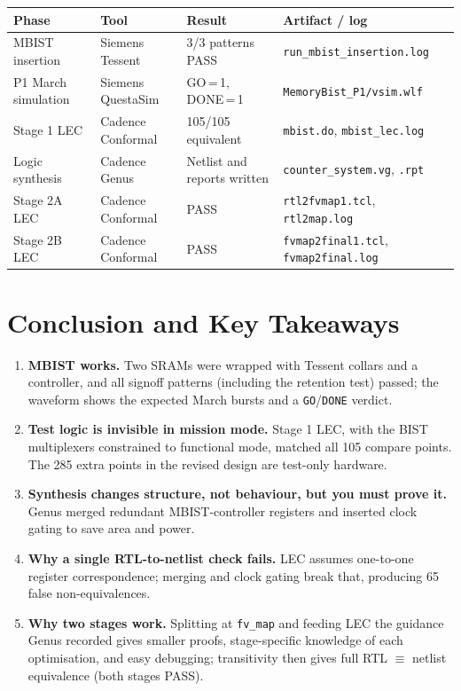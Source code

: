 \documentclass[11pt]{article}
\newcommand{\code}[1]{\texttt{\small #1}}
\begin{document}
\begin{center}
\small
\begin{tabular}{@{}p{3.1cm}p{3.1cm}p{3.5cm}p{4.6cm}@{}}
\toprule
\textbf{Phase} & \textbf{Tool} & \textbf{Result} & \textbf{Artifact / log} \\ \midrule
MBIST insertion & Siemens Tessent & 3/3 patterns PASS & \code{run\_mbist\_insertion.log} \\
P1 March simulation & Siemens QuestaSim & GO\,=\,1, DONE\,=\,1 & \code{MemoryBist\_P1/vsim.wlf} \\
Stage 1 LEC & Cadence Conformal & 105/105 equivalent & \code{mbist.do}, \code{mbist\_lec.log} \\
Logic synthesis & Cadence Genus & Netlist and reports written & \code{counter\_system.vg}, \code{*.rpt} \\
Stage 2A LEC & Cadence Conformal & PASS & \code{rtl2fvmap1.tcl}, \code{rtl2map.log} \\
Stage 2B LEC & Cadence Conformal & PASS & \code{fvmap2final1.tcl}, \code{fvmap2final.log} \\ \bottomrule
\end{tabular}
\end{center}

\section{Conclusion and Key Takeaways}

\begin{enumerate}
  \item \textbf{MBIST works.} Two SRAMs were wrapped with Tessent collars and a controller, and all signoff patterns (including the retention test) passed; the waveform shows the expected March bursts and a \code{GO}/\code{DONE} verdict.
  \item \textbf{Test logic is invisible in mission mode.} Stage 1 LEC, with the BIST multiplexers constrained to functional mode, matched all 105 compare points. The 285 extra points in the revised design are test-only hardware.
  \item \textbf{Synthesis changes structure, not behaviour, but you must prove it.} Genus merged redundant MBIST-controller registers and inserted clock gating to save area and power.
  \item \textbf{Why a single RTL-to-netlist check fails.} LEC assumes one-to-one register correspondence; merging and clock gating break that, producing 65 false non-equivalences.
  \item \textbf{Why two stages work.} Splitting at \code{fv\_map} and feeding LEC the guidance Genus recorded gives smaller proofs, stage-specific knowledge of each optimisation, and easy debugging; transitivity then gives full RTL $\equiv$ netlist equivalence (both stages PASS).
\end{enumerate}
\end{document}

